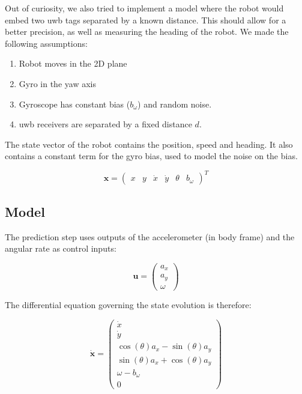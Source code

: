\documentclass[a4paper, 12pt]{scrreprt}
\begin{document}
Out of curiosity, we also tried to implement a model where the robot would embed two \gls{uwb} tags separated by a known distance.
This should allow for a better precision, as well as measuring the heading of the robot.
We made the following assumptions:

\begin{enumerate}
    \item Robot moves in the 2D plane
    \item Gyro in the yaw axis
    \item  Gyroscope has constant bias ($b_\omega$) and random noise.
    \item \gls{uwb} receivers are separated by a fixed distance $d$.
\end{enumerate}

The state vector of the robot contains the position, speed and heading.
It also contains a constant term for the gyro bias, used to model the noise on the bias.


\begin{equation}
\mathbf{x} = \begin{pmatrix} x & y & \dot{x} & \dot{y} & \theta & b_{\omega} \end{pmatrix}^T
\end{equation}

\subsection{Model}

The prediction step uses outputs of the accelerometer (in body frame) and the angular rate as control inputs:

\begin{equation}
\mathbf{u} = \begin{pmatrix}
    a_x\\
    a_y\\
    \omega
\end{pmatrix}
\end{equation}

The differential equation governing the state evolution is therefore:

\begin{equation}
\mathbf{\dot{x}} = \begin{pmatrix}
\dot{x}\\
\dot{y}\\
\cos(\theta) a_x - \sin(\theta) a_y \\
\sin(\theta) a_x + \cos(\theta) a_y \\
\omega - b_{\omega}\\
0
\end{pmatrix}
\end{equation}
\end{document}
